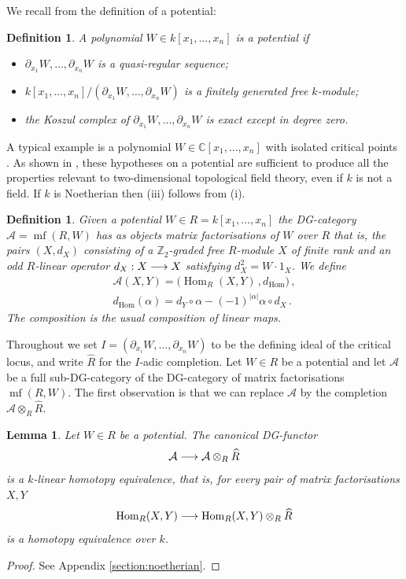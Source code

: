 \documentclass[english,letter paper,12pt,leqno]{article}
\newtheorem{lemma}[theorem]{Lemma}
\theoremstyle{example}
\newtheorem{definition}[theorem]{Definition}
\numberwithin{equation}{section}
\def\AA{\mathcal{A}}
\def\Hom{\operatorname{Hom}}
\DeclareMathOperator{\mfdg}{mf}
\begin{document}
We recall from \cite{lgdual} the definition of a potential:

\begin{definition}\label{defn:potential} A polynomial $W \in k[x_1,\ldots,x_n]$ is a \textsl{potential} if
\begin{itemize}
\item[(i)] $\partial_{x_1} W,\ldots,\partial_{x_n} W$ is a quasi-regular sequence;
\item[(ii)] $k[x_1,\ldots,x_n]/(\partial_{x_1} W,\ldots,\partial_{x_n} W)$ is a finitely generated free $k$-module;
\item[(iii)] the Koszul complex of $\partial_{x_1} W,\ldots,\partial_{x_n} W$ is exact except in degree zero.
\end{itemize}
\end{definition}

A typical example is a polynomial $W \in \mathbb{C}[x_1,\ldots,x_n]$ with isolated critical points \cite[Example 2.5]{lgdual}. As shown in \cite{lgdual}, these hypotheses on a potential are sufficient to produce all the properties relevant to two-dimensional topological field theory, even if $k$ is not a field. If $k$ is Noetherian then (iii) follows from (i).

\begin{definition} Given a potential $W \in R = k[x_1,\ldots,x_n]$ the DG-category $\AA = \mfdg(R,W)$ has as objects \emph{matrix factorisations} of $W$ over $R$ \cite{EisenbudMF} that is, the pairs $(X, d_X)$ consisting of a $\mathbb{Z}_2$-graded free $R$-module $X$ of finite rank and an odd $R$-linear operator $d_X: X \longrightarrow X$ satisfying $d_X^2 = W \cdot 1_X$. We define
\begin{gather*}
\AA(X,Y) = \big( \Hom_R(X,Y) \,, d_{\Hom} \big)\,,\\
d_{\Hom}(\alpha)  = d_Y \circ \alpha - (-1)^{|\alpha|} \alpha \circ d_X\,.
\end{gather*}
The composition is the usual composition of linear maps.
\end{definition}

Throughout we set $I = ( \partial_{x_i} W, \ldots, \partial_{x_n} W )$ to be the defining ideal of the critical locus, and write $\widehat{R}$ for the $I$-adic completion. Let $W \in R$ be a potential and let $\AA$ be a full sub-DG-category of the DG-category of matrix factorisations $\mfdg( R, W )$. The first observation is that we can replace $\AA$ by the completion $\AA \otimes_R \widehat{R}$.

\begin{lemma}\label{lemma:completion_he} Let $W \in R$ be a potential. The canonical DG-functor
\[
\AA \lto \AA \otimes_R \widehat{R}
\]
is a $k$-linear homotopy equivalence, that is, for every pair of matrix factorisations $X,Y$
\[
\Hom_R(X,Y) \lto \Hom_R(X,Y) \otimes_R \widehat{R}
\]
is a homotopy equivalence over $k$.
\end{lemma}
\begin{proof}
See Appendix \ref{section:noetherian}.
\end{proof}
\end{document}
